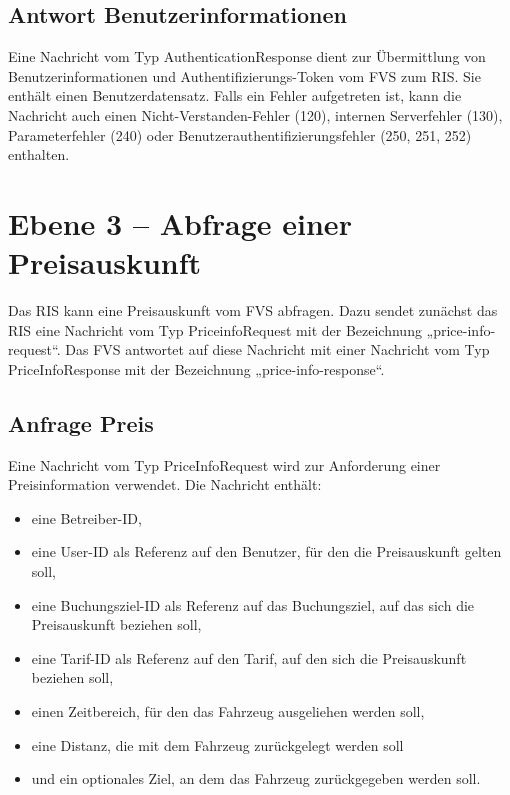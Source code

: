 

\subsection{Antwort Benutzerinformationen}
Eine Nachricht vom Typ AuthenticationResponse dient zur Übermittlung von Benutzerinformationen und Authentifizierungs-Token vom FVS zum RIS. Sie enthält einen Benutzerdatensatz. Falls ein Fehler aufgetreten ist, kann die Nachricht auch einen Nicht-Verstanden-Fehler (120), internen Serverfehler (130), Parameterfehler (240) oder Benutzerauthentifizierungsfehler (250, 251, 252) enthalten.




\section{Ebene 3 -- Abfrage einer Preisauskunft}
Das RIS kann eine Preisauskunft vom FVS abfragen. Dazu sendet zunächst das RIS eine Nachricht vom Typ PriceinfoRequest mit der Bezeichnung „price-info-request“. Das FVS antwortet auf diese Nachricht mit einer Nachricht vom Typ PriceInfoResponse mit der Bezeichnung „price-info-response“.



\subsection{Anfrage Preis}
Eine Nachricht vom Typ PriceInfoRequest wird zur Anforderung einer Preisinformation verwendet. Die Nachricht enthält:
\begin{itemize}
\item eine Betreiber-ID,
\item eine User-ID als Referenz auf den Benutzer, für den die Preisauskunft gelten soll,
\item eine Buchungsziel-ID als Referenz auf das Buchungsziel, auf das sich die Preisauskunft beziehen soll,
\item eine Tarif-ID als Referenz auf den Tarif, auf den sich die Preisauskunft beziehen soll,
\item einen Zeitbereich, für den das Fahrzeug ausgeliehen werden soll,
\item eine Distanz, die mit dem Fahrzeug zurückgelegt werden soll
\item und ein optionales Ziel, an dem das Fahrzeug zurückgegeben werden soll.
\end{itemize}


